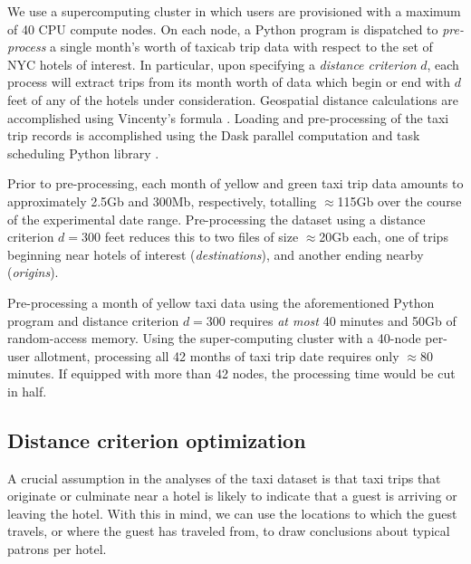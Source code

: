 \documentclass[useAMS, referee, usenatbib]{biom}
\begin{document}
We use a supercomputing cluster in which users are provisioned with a maximum of 40 CPU compute nodes. On each node, a Python program is dispatched to \textit{pre-process} a single month's worth of taxicab trip data with respect to the set of NYC hotels of interest. In particular, upon specifying a \textit{distance criterion} $d$, each process will extract trips from its month worth of data which begin or end with $d$ feet of any of the hotels under consideration. Geospatial distance calculations are accomplished using Vincenty's formula \citep{bessel_calculation_2010}. Loading and pre-processing of the taxi trip records is accomplished using the Dask parallel computation and task scheduling Python library \cite{dask}.

Prior to pre-processing, each month of yellow and green taxi trip data amounts to approximately 2.5Gb and 300Mb, respectively, totalling $\approx$115Gb over the course of the experimental date range. Pre-processing the dataset using a distance criterion $d = 300$ feet reduces this to two files of size $\approx$20Gb each, one of trips beginning near hotels of interest (\textit{destinations}), and another ending nearby (\textit{origins}).

Pre-processing a month of yellow taxi data using the aforementioned Python program and distance criterion $d = 300$ requires \textit{at most} 40 minutes and 50Gb of random-access memory. Using the super-computing cluster with a 40-node per-user allotment, processing all 42 months of taxi trip date requires only $\approx$80 minutes. If equipped with more than 42 nodes, the processing time would be cut in half.

\subsection{Distance criterion optimization}

A crucial assumption in the analyses of the taxi dataset is that taxi trips that originate or culminate near a hotel is likely to indicate that a guest is arriving or leaving the hotel. With this in mind, we can use the locations to which the guest travels, or where the guest has traveled from, to draw conclusions about typical patrons per hotel.
\end{document}
